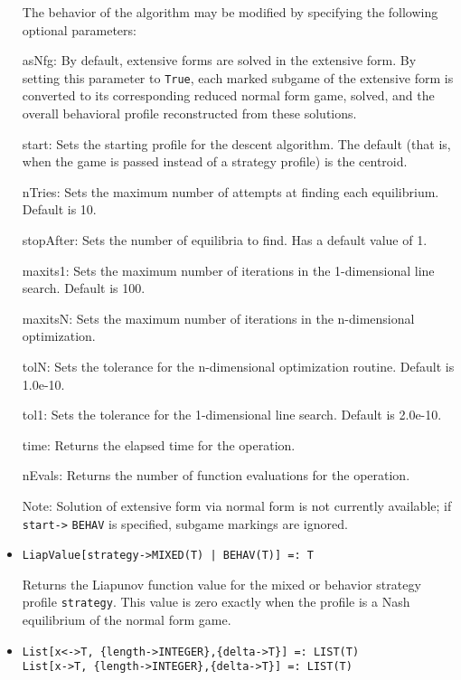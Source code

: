 \begin{itemize}
The behavior of the algorithm may be modified by specifying the following
optional parameters:
\bd
\item
[asNfg:] By default, extensive forms are solved in the extensive form.
By setting this parameter to \verb+True+, each marked subgame of the
extensive form is converted to its corresponding reduced normal form game,
solved, and the overall behavioral profile reconstructed from these
solutions.
\item
[start:] Sets the starting profile for the descent algorithm.  The
default (that is, when the game is passed instead of a strategy
profile) is the centroid.
\item
[nTries:] Sets the maximum number of attempts at finding each
equilibrium. Default is 10.
\item
[stopAfter:] Sets the number of equilibria to find.  Has a default
value of 1.  
\item
[maxits1:] Sets the maximum number of iterations in the
1-dimensional line search.  Default is 100.
\item
[maxitsN:] Sets the maximum number of iterations in the
n-dimensional optimization.  
\item
[tolN:] Sets the tolerance for the n-dimensional optimization
routine.  Default is 1.0e-10.
\item
[tol1:] Sets the tolerance for the 1-dimensional line search.
Default is 2.0e-10.
\item
[time:] Returns the elapsed time for the operation.
\item
[nEvals:] Returns the number of function evaluations for the operation.
\ed

\item
[Note:] Solution of extensive form via normal form is not currently
available; if \verb+start->+ \verb+BEHAV+ is specified, subgame markings are ignored.
\ed

\item
\protect \large \begin{verbatim}
LiapValue[strategy->MIXED(T) | BEHAV(T)] =: T
\end{verbatim} \normalsize

\bd Returns the Liapunov function value for the mixed or behavior
strategy profile \verb+strategy+.  This value is zero exactly when the
profile is a Nash equilibrium of the normal form game.  
\ed

\item
\protect \large \begin{verbatim}
List[x<->T, {length->INTEGER},{delta->T}] =: LIST(T)
List[x->T, {length->INTEGER},{delta->T}] =: LIST(T)
\end{verbatim}\normalsize


\end{itemize}
